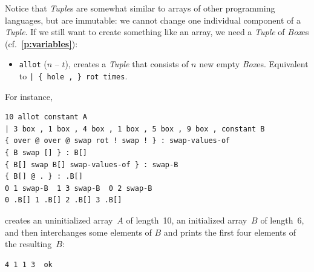 \documentclass[12pt,oneside]{article}
\def\refpoint#1{{\rm\textbf{\ref{#1}}}}
\let\ptref=\refpoint
\begin{document}
Notice that {\em Tuple\/}s are somewhat similar to arrays of other programming languages, but are immutable: we cannot change one individual component of a {\em Tuple}. If we still want to create something like an array, we need a {\em Tuple\/} of {\em Box\/}es (cf.~\ptref{p:variables}):
\begin{itemize}
\item {\tt allot} ($n$ -- $t$), creates a {\em Tuple\/} that consists of $n$ new empty {\em Box\/}es. Equivalent to {\tt | \{ hole , \} rot times}.
\end{itemize}
For instance,
\begin{verbatim}
10 allot constant A
| 3 box , 1 box , 4 box , 1 box , 5 box , 9 box , constant B
{ over @ over @ swap rot ! swap ! } : swap-values-of
{ B swap [] } : B[]
{ B[] swap B[] swap-values-of } : swap-B
{ B[] @ . } : .B[]
0 1 swap-B  1 3 swap-B  0 2 swap-B
0 .B[] 1 .B[] 2 .B[] 3 .B[]
\end{verbatim}
creates an uninitialized array~$A$ of length~10, an initialized array~$B$ of length~6, and then interchanges some elements of $B$ and prints the first four elements of the resulting~$B$:
\begin{verbatim}
4 1 1 3  ok
\end{verbatim}
\end{document}
